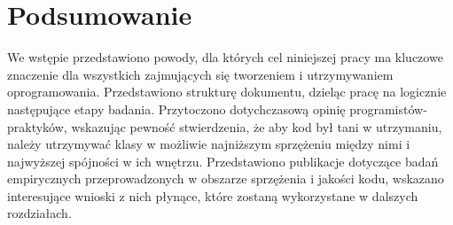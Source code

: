 

\section{Podsumowanie}

We wstępie przedstawiono powody, dla których cel niniejszej pracy ma kluczowe
znaczenie dla wszystkich zajmujących się tworzeniem i utrzymywaniem
oprogramowania.
Przedstawiono strukturę dokumentu, dzieląc pracę na logicznie następujące
etapy badania.
Przytoczono dotychczasową opinię programistów-praktyków, wskazując pewność
stwierdzenia, że aby kod był tani w utrzymaniu, należy utrzymywać klasy
w możliwie najniższym sprzężeniu między nimi i najwyższej spójności w ich wnętrzu.
Przedstawiono publikacje dotyczące badań empirycznych przeprowadzonych w
obszarze sprzężenia i jakości kodu, wskazano interesujące wnioski z nich
płynące, które zostaną wykorzystane w dalszych rozdziałach.